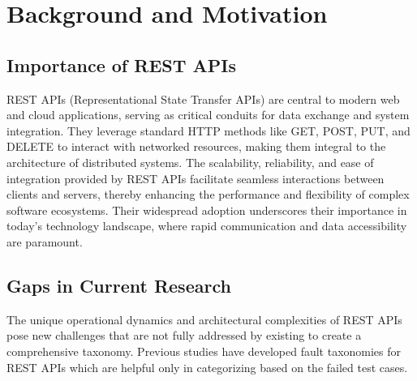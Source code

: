 \documentclass[conference]{IEEEtran}
\begin{document}
\section{Background and Motivation}
\label{sec:background-and-motivation}

\subsection{Importance of REST APIs}
REST APIs (Representational State Transfer APIs) are central to modern web and cloud applications, serving as critical conduits for data exchange and system integration. 
They leverage standard HTTP methods like GET, POST, PUT, and DELETE to interact with networked resources, making them integral to the architecture of distributed systems. 
The scalability, reliability, and ease of integration provided by REST APIs facilitate seamless interactions between clients and servers, thereby enhancing the performance and flexibility of complex software ecosystems. 
Their widespread adoption underscores their importance in today's technology landscape, where rapid communication and data accessibility are paramount.


\subsection{Gaps in Current Research}
The unique operational dynamics and architectural complexities of REST APIs pose new challenges that are not fully addressed by existing to create a comprehensive taxonomy.
Previous studies have developed fault taxonomies for REST APIs which are helpful only in categorizing based on the failed test cases.
\end{document}
